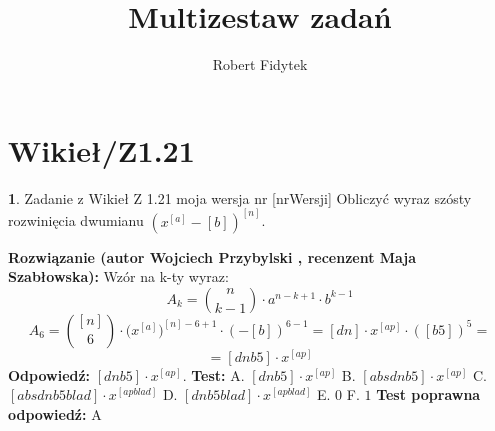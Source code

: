 \documentclass[12pt, a4paper]{article}
\title{Multizestaw zadań}
\author{Robert Fidytek}
\date{}
\theoremstyle{definition} %
\newtheorem{zad}{}
\newcommand{\kategoria}[1]{\section{#1}} %
\newcommand{\zadStart}[1]{\begin{zad}#1\newline} %
\newcommand{\zadStop}{\end{zad}}   %
\newcommand{\rozwStart}[2]{\noindent \textbf{Rozwiązanie (autor #1 , recenzent #2): }\newline} %
\newcommand{\rozwStop}{\newline}                                            %
\newcommand{\odpStart}{\noindent \textbf{Odpowiedź:}\newline}    %
\newcommand{\odpStop}{\newline}                                             %
\newcommand{\testStart}{\noindent \textbf{Test:}\newline} %
\newcommand{\testStop}{\newline} %
\newcommand{\kluczStart}{\noindent \textbf{Test poprawna odpowiedź:}\newline} %
\newcommand{\kluczStop}{\newline} %
\begin{document}
\maketitle


\kategoria{Wikieł/Z1.21}
\zadStart{Zadanie z Wikieł Z 1.21  moja wersja nr [nrWersji]}
Obliczyć wyraz szósty rozwinięcia dwumianu $(x^{[a]}-[b])^{[n]}$.
\zadStop
\rozwStart{Wojciech Przybylski}{Maja Szabłowska}
Wzór na k-ty wyraz:
$$A_{k}={n\choose k-1}\cdot a^{n-k+1}\cdot b^{k-1}$$
$$A_{6}={[n]\choose 6}\cdot \big(x^{[a]}\big)^{[n]-6+1}\cdot (-[b])^{6-1}=[dn]\cdot x^{[ap]}\cdot ([b5])^{5}=$$
$$=[dnb5]\cdot x^{[ap]}$$
\rozwStop
\odpStart
$[dnb5]\cdot x^{[ap]}$.
\odpStop
\testStart
A. $[dnb5]\cdot x^{[ap]}$
B. $[absdnb5]\cdot x^{[ap]}$
C. $[absdnb5blad]\cdot x^{[apblad]}$
D. $[dnb5blad]\cdot x^{[apblad]}$
E. $0$
F. $1$
\testStop
\kluczStart
A
\kluczStop
\end{document}

